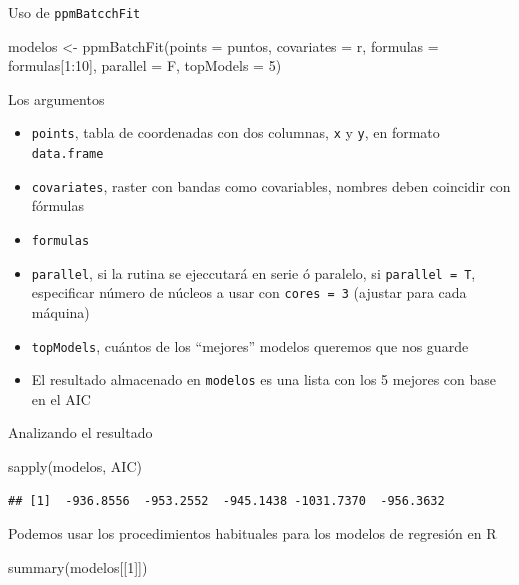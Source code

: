 \documentclass[
  11pt,
  ignorenonframetext,
]{beamer}
\newenvironment{Shaded}{}{}
\newcommand{\AttributeTok}[1]{\textcolor[rgb]{0.49,0.56,0.16}{#1}}
\newcommand{\DecValTok}[1]{\textcolor[rgb]{0.25,0.63,0.44}{#1}}
\newcommand{\FunctionTok}[1]{\textcolor[rgb]{0.02,0.16,0.49}{#1}}
\newcommand{\NormalTok}[1]{#1}
\newcommand{\OtherTok}[1]{\textcolor[rgb]{0.00,0.44,0.13}{#1}}
\newcommand{\SpecialCharTok}[1]{\textcolor[rgb]{0.25,0.44,0.63}{#1}}
\begin{document}
\begin{frame}[fragile]{Uso de \texttt{ppmBatcchFit}}
\protect\hypertarget{uso-de-ppmbatcchfit}{}
\begin{Shaded}
\begin{Highlighting}[]
\NormalTok{modelos }\OtherTok{\textless{}{-}} \FunctionTok{ppmBatchFit}\NormalTok{(}\AttributeTok{points =}\NormalTok{ puntos,}
                       \AttributeTok{covariates =}\NormalTok{ r, }
                       \AttributeTok{formulas =}\NormalTok{ formulas[}\DecValTok{1}\SpecialCharTok{:}\DecValTok{10}\NormalTok{],}
                       \AttributeTok{parallel =}\NormalTok{ F,}
                       \AttributeTok{topModels =} \DecValTok{5}\NormalTok{)}
\end{Highlighting}
\end{Shaded}
\end{frame}

\begin{frame}[fragile]{Los argumentos}
\protect\hypertarget{los-argumentos}{}
\begin{itemize}
\item
  \texttt{points}, tabla de coordenadas con dos columnas, \texttt{x} y
  \texttt{y}, en formato \texttt{data.frame}
\item
  \texttt{covariates}, raster con bandas como covariables, nombres deben
  coincidir con fórmulas
\item
  \texttt{formulas}
\item
  \texttt{parallel}, si la rutina se ejeccutará en serie ó paralelo, si
  \texttt{parallel\ =\ T}, especificar número de núcleos a usar con
  \texttt{cores\ =\ 3} (ajustar para cada máquina)
\item
  \texttt{topModels}, cuántos de los ``mejores'' modelos queremos que
  nos guarde
\item
  El resultado almacenado en \texttt{modelos} es una lista con los 5
  mejores con base en el AIC
\end{itemize}
\end{frame}

\begin{frame}[fragile]{Analizando el resultado}
\protect\hypertarget{analizando-el-resultado}{}
\begin{Shaded}
\begin{Highlighting}[]
\FunctionTok{sapply}\NormalTok{(modelos, AIC)}
\end{Highlighting}
\end{Shaded}

\begin{verbatim}
## [1]  -936.8556  -953.2552  -945.1438 -1031.7370  -956.3632
\end{verbatim}

Podemos usar los procedimientos habituales para los modelos de regresión
en R

\begin{Shaded}
\begin{Highlighting}[]
\FunctionTok{summary}\NormalTok{(modelos[[}\DecValTok{1}\NormalTok{]])}
\end{Highlighting}
\end{Shaded}
\end{frame}
\end{document}
